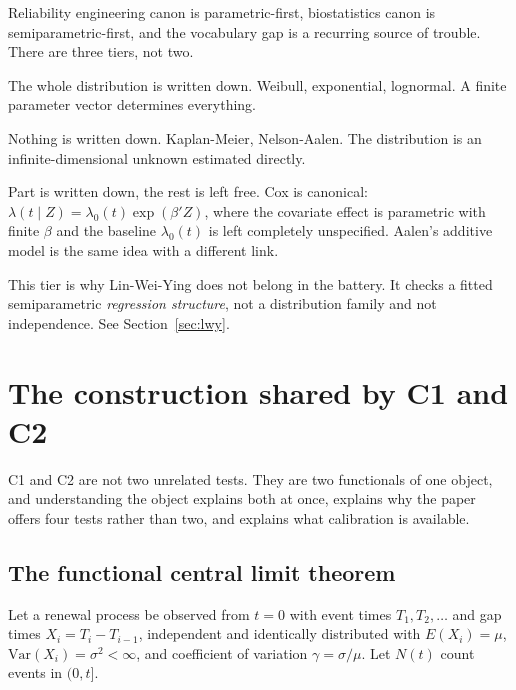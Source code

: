 \documentclass[11pt,a4paper]{article}
\begin{document}
Reliability engineering canon is parametric-first, biostatistics canon is
semiparametric-first, and the vocabulary gap is a recurring source of trouble. There are
three tiers, not two.

\begin{description}[leftmargin=1.6em,itemsep=2pt]
\item[Parametric.] The whole distribution is written down. Weibull, exponential,
lognormal. A finite parameter vector determines everything.
\item[Nonparametric.] Nothing is written down. Kaplan-Meier, Nelson-Aalen. The
distribution is an infinite-dimensional unknown estimated directly.
\item[Semiparametric.] Part is written down, the rest is left free. Cox is canonical:
$\lambda(t \mid Z) = \lambda_0(t)\exp(\beta' Z)$, where the covariate effect is
parametric with finite $\beta$ and the baseline $\lambda_0(t)$ is left completely
unspecified. Aalen's additive model is the same idea with a different link.
\end{description}

This tier is why Lin-Wei-Ying does not belong in the battery. It checks a fitted
semiparametric \emph{regression structure}, not a distribution family and not
independence. See Section~\ref{sec:lwy}.

\section{The construction shared by C1 and C2}

C1 and C2 are not two unrelated tests. They are two functionals of one object, and
understanding the object explains both at once, explains why the paper offers four
tests rather than two, and explains what calibration is available.

\subsection{The functional central limit theorem}

Let a renewal process be observed from $t = 0$ with event times $T_1, T_2, \dots$ and
gap times $X_i = T_i - T_{i-1}$, independent and identically distributed with
$E(X_i) = \mu$, $\mathrm{Var}(X_i) = \sigma^2 < \infty$, and coefficient of variation
$\gamma = \sigma/\mu$. Let $N(t)$ count events in $(0,t]$.
\end{document}
